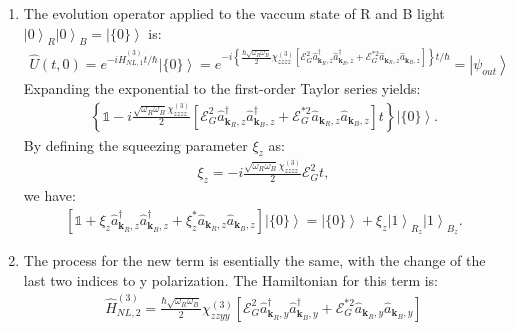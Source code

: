 \documentclass[letterpaper,11pt,twoside]{article}
\newcommand{\E}{\mathcal{E}}
\newcommand{\bk}{\bm{k}}
\newcommand{\hU}{\hat{U}}
\newcommand{\ha}{\hat{a}}
\newcommand{\hH}{\hat{H}}
\newcommand{\ket}[1]{\left|#1\right\rangle}
\begin{document}
\begin{enumerate}[itemsep=0pt,topsep=0pt,parsep=0pt,label=\alph*)]
  momentum conservation:
  \begin{align*}
    \pm2\omega_G\mp(\omega_R+\omega_B)=0&\Longrightarrow\text{Energy conservation}:2\omega_G=\omega_R+\omega_B,\\
    \pm2kx\mp(\bk_R+\bk_B)&\Longrightarrow\text{Momentum conservation}:2kx=\bk_R+\bk_B.
  \end{align*}
  The difference of blue and red frequencies is still in the optical frequency. The Hamiltonian then reduces to
  \begin{align*}
    \hH_{NL,1}^{(3)}=\frac{\hbar\sqrt{\omega_R\omega_B}}{2}\chi_{zzzz}^{(3)}\left[\E_G^2\ha^\dagger_{\bk_R,z}\ha^\dagger_{\bk_B,z}+\E_G^{*2}\ha_{\bk_R,z}\ha_{\bk_B,z}\right]. 
  \end{align*}
  \item The evolution operator applied to the vaccum state of R and B light $\ket{0}_R\ket{0}_B=\ket{\{0\}}$ is:
  \begin{align*}
    \hU(t,0)=e^{-i\hH_{NL,1}^{(3)}t/\hbar}\ket{\{0\}}=e^{-i\left\{\frac{\hbar\sqrt{\omega_R\omega_B}}{2}\chi_{zzzz}^{(3)}\left[\E_G^2\ha^\dagger_{\bk_R,z}\ha^\dagger_{\bk_B,z}+\E_G^{*2}\ha_{\bk_R,z}\ha_{\bk_B,z}\right]\right\}t/\hbar}=\ket{\psi_{out}}
  \end{align*}
  Expanding the exponential to the first-order Taylor series yields:
  \begin{align*}
    \left\{\mathds{1}-i\frac{\sqrt{\omega_R\omega_B}\chi_{zzzz}^{(3)}}{2}\left[\E_G^2\ha^\dagger_{\bk_R,z}\ha^\dagger_{\bk_B,z}+\E_G^{*2}\ha_{\bk_R,z}\ha_{\bk_B,z}\right]t\right\}\ket{\{0\}}.
  \end{align*}
  By defining the squeezing parameter $\xi_z$ as:
  \begin{align*}
    \xi_z=-i\frac{\sqrt{\omega_R\omega_B}\chi_{zzzz}^{(3)}}{2}\E_G^2t,
  \end{align*}
  we have:
  \begin{align*}
    \left[\mathds{1}+\xi_z\ha^\dagger_{\bk_R,z}\ha^\dagger_{\bk_B,z}+\xi^*_z\ha_{\bk_R,z}\ha_{\bk_B,z}\right]\ket{\{0\}}=\ket{\{0\}}+\xi_z\ket{1}_{R_z}\ket{1}_{B_z}.
  \end{align*}
  \item The process for the new term is esentially the same, with the change of 
  the last two indices to y polarization. The Hamiltonian for this term 
  is: 
  \begin{align*}
    \hH^{(3)}_{NL,2}=\frac{\hbar\sqrt{\omega_R\omega_B}}{2}\chi_{zzyy}^{(3)}\left[\E^2_G\ha^\dagger_{\bk_R,y}\ha^\dagger_{\bk_B,y}+\E^{*2}_G\ha_{\bk_R,y}\ha_{\bk_B,y}\right]

\end{align*}
\end{enumerate}
\end{document}
